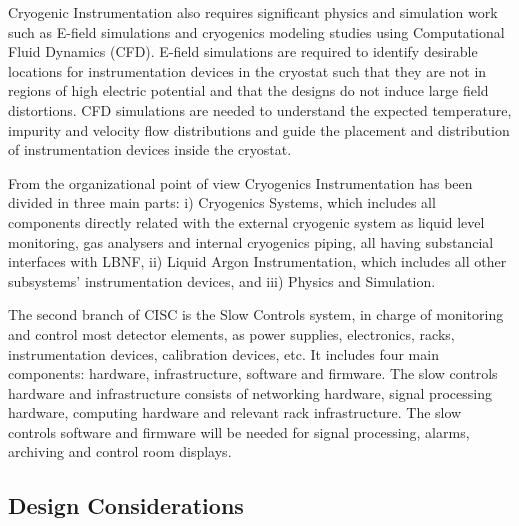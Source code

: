 Cryogenic Instrumentation also requires significant physics and
simulation work such as E-field simulations and cryogenics modeling
studies using Computational Fluid Dynamics (CFD). E-field simulations
are required to identify desirable locations for instrumentation
devices in the cryostat such that they are not in regions of high electric potential and
that the designs do not induce large field distortions. CFD
simulations are needed to understand the expected temperature,
impurity and velocity flow distributions and guide the placement and
distribution of instrumentation devices inside the cryostat.


From the organizational point of view
Cryogenics Instrumentation has been divided in three main parts: i) Cryogenics Systems, which includes all components directly related with the external cryogenic system as
liquid level monitoring, gas analysers and internal cryogenics piping, all having substancial interfaces with LBNF, ii) Liquid Argon Instrumentation, which includes all
other subsystems' instrumentation devices, and iii) Physics and Simulation.


The second branch of CISC is the Slow Controls system, in charge of monitoring and control most detector elements, as power supplies, electronics, racks, instrumentation devices,
calibration devices, etc. It includes four main components: hardware, infrastructure,
software and firmware. The slow controls hardware and infrastructure consists of
networking hardware, signal processing hardware, computing hardware and relevant
rack infrastructure. The slow controls software and firmware will be needed for
signal processing, alarms, archiving and control room displays.



\subsection{Design Considerations}
\label{sec:fddp-slow-cryo-des-consid}


